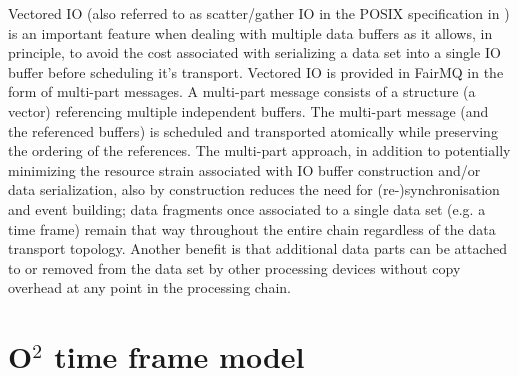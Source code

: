 \documentclass[a4paper,twoside]{article}
\newcommand\comment[1]{\color{red}{ #1 }\color{black}}
\def\O2{O$^2$}
\begin{document}
Vectored IO (also referred to as scatter/gather IO in the POSIX specification in \cite{posix}) is an important feature when dealing with multiple data buffers as it allows, in principle, to avoid the cost associated with serializing a data set into a single IO buffer before scheduling it's transport.
Vectored IO is provided in FairMQ in the form of multi-part messages. A multi-part message consists of a structure (a vector) referencing multiple independent buffers. The multi-part message (and the referenced buffers) is scheduled and transported atomically while preserving the ordering of the references.
The multi-part approach, in addition to potentially minimizing the resource strain associated with IO buffer construction and/or data serialization, also by construction reduces the need for (re-)synchronisation and event building; data fragments once associated to a single data set (e.g. a time frame) remain that way throughout the entire chain regardless of the data transport topology. Another benefit is that additional data parts can be attached to or removed from the data set by other processing devices without copy overhead at any point in the processing chain.

\comment{
In the case zero-copy vectored IO is not supported by the transport layer, compromises have to be made. One possibility is to construct a single message by serializing the contents of all the associated buffers into a single message buffer, this step can be performed transparently to the application.

Another option, if a zero-copy approach is needed, is to prevent the queues from multiplexing and load balancing messages to/from different endpoints by requiring socket-like point-to-point topologies; this, however, introduces a dependency of the data model on runtime configuration and excludes most of the high level features provided by current FairMQ backends, most notably the messaging patterns. Other options may of course exist.
}

\section{\O2 time frame model}
\end{document}
